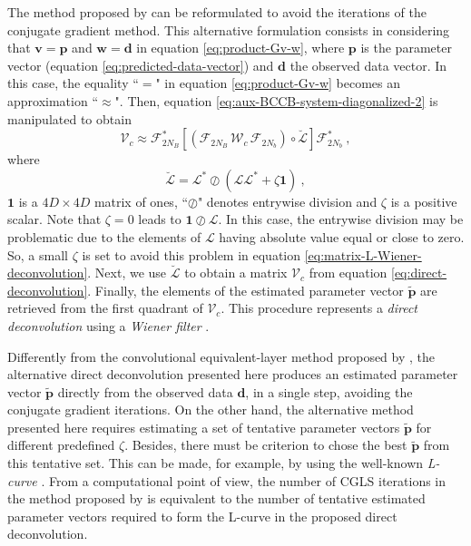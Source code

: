 The method proposed by \citet{takahashi-etal2020, takahashi-etal2022} can be reformulated to avoid the iterations 
of the conjugate gradient method.
This alternative formulation consists in considering that $\mathbf{v} = \mathbf{p}$ and 
$\mathbf{w} = \mathbf{d}$ in equation \ref{eq:product-Gv-w}, where $\mathbf{p}$ is the parameter vector (equation \ref{eq:predicted-data-vector})
and $\mathbf{d}$ the observed data vector.
In this case, the equality ``$=$" in equation \ref{eq:product-Gv-w} becomes an approximation ``$\approx$".
Then, equation \ref{eq:aux-BCCB-system-diagonalized-2} is manipulated to obtain
\begin{equation}
	\boldsymbol{\mathcal{V}}_{c} \approx 
	\boldsymbol{\mathcal{F}}_{2N_{B}}^{\ast} 
	\left[ \left( \boldsymbol{\mathcal{F}}_{2N_{B}} \, \boldsymbol{\mathcal{W}}_{c} \, \boldsymbol{\mathcal{F}}_{2N_{b}} \right)
	\circ \breve{\boldsymbol{\mathcal{L}}} \right] \boldsymbol{\mathcal{F}}_{2N_{b}}^{\ast} \: ,
	\label{eq:direct-deconvolution}
\end{equation}
where
\begin{equation}
	\breve{\boldsymbol{\mathcal{L}}} = 
	\boldsymbol{\mathcal{L}}^{\ast} \oslash \left( \boldsymbol{\mathcal{L}} \boldsymbol{\mathcal{L}}^{\ast} + \zeta \mathbf{1} \right) \: ,
	\label{eq:matrix-L-Wiener-deconvolution}
\end{equation}
$\mathbf{1}$ is a $4D \times 4D$ matrix of ones, ``$\oslash$" denotes entrywise division and 
$\zeta$ is a positive scalar.
Note that $\zeta = 0$ leads to $\mathbf{1} \oslash \boldsymbol{\mathcal{L}}$.
In this case, the entrywise division may be problematic due to the elements of $\boldsymbol{\mathcal{L}}$ 
having absolute value equal or close to zero. So, a small $\zeta$ is set to avoid this problem
in equation \ref{eq:matrix-L-Wiener-deconvolution}.
Next, we use $\breve{\boldsymbol{\mathcal{L}}}$ to obtain a matrix $\boldsymbol{\mathcal{V}}_{c}$ from equation \ref{eq:direct-deconvolution}.
Finally, the elements of the estimated parameter vector $\tilde{\mathbf{p}}$ are retrieved from the first
quadrant of $\boldsymbol{\mathcal{V}}_{c}$.
This procedure represents a \textit{direct deconvolution} \citep[e.g.,][p. 220]{aster_etal2019}
using a \textit{Wiener filter} \citep[e.g.,][p. 263]{gonzalez-woods2002}.

Differently from the convolutional equivalent-layer method proposed by 
\citet{takahashi-etal2020, takahashi-etal2022}, the alternative direct deconvolution presented here 
produces an estimated parameter vector $\tilde{\mathbf{p}}$ directly from the observed data $\mathbf{d}$, in a single step,
avoiding the conjugate gradient iterations.
On the other hand, the alternative method presented here requires estimating a set of tentative parameter vectors $\tilde{\mathbf{p}}$
for different predefined $\zeta$. Besides, there must be criterion to chose the best $\tilde{\mathbf{p}}$ from this tentative set.
This can be made, for example, by using the well-known \textit{L-curve} \citep{hansen1992}.
From a computational point of view, the number of CGLS iterations in the method proposed by \citet{takahashi-etal2020, takahashi-etal2022}
is equivalent to the number of tentative estimated parameter vectors required to form the L-curve in the proposed
direct deconvolution.

